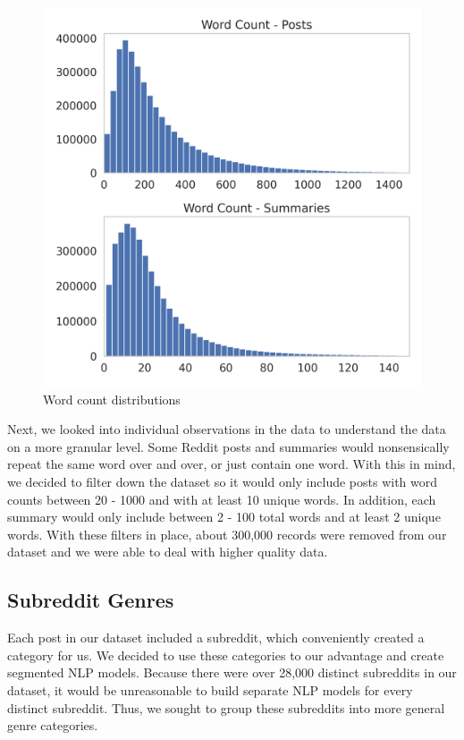 \documentclass[11pt,a4paper, twocolumn]{article}
\begin{document}
\begin{figure}[h]
  \includegraphics[width=.95\linewidth]{word_counts.png}
  \caption{Word count distributions}
  \label{fig:word_counts}
\end{figure}


Next, we looked into individual observations in the data to understand the data on a more granular level. 
Some Reddit posts and summaries would nonsensically repeat the same word over and over, or just contain one word. 
With this in mind, we decided to filter down the dataset so it would only include posts with word counts between 20 - 1000 and with at least 10 unique words. 
In addition, each summary would only include between 2 - 100 total words and at least 2 unique words. 
With these filters in place, about 300,000 records were removed from our dataset and we were able to deal with higher quality data. 

\subsection{Subreddit Genres}

Each post in our dataset included a subreddit, which conveniently created a category for us. 
We decided to use these categories to our advantage and create segmented NLP models. 
Because there were over 28,000 distinct subreddits in our dataset, it would be unreasonable to build separate NLP models for every distinct subreddit. 
Thus, we sought to group these subreddits into more general genre categories. 
\end{document}
